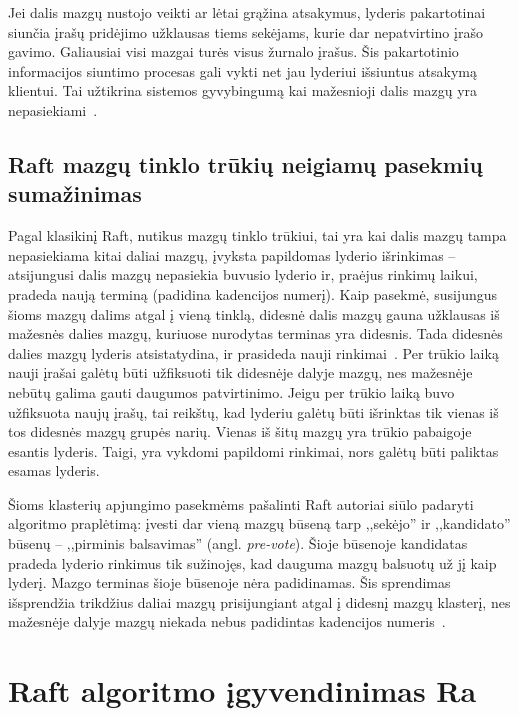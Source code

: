 \documentclass{VUMIFPSkursinis}
\begin{document}
Jei dalis mazgų nustojo veikti ar lėtai grąžina atsakymus, lyderis pakartotinai siunčia įrašų pridėjimo užklausas tiems sekėjams, kurie dar nepatvirtino įrašo gavimo. Galiausiai visi mazgai turės visus žurnalo įrašus. Šis pakartotinio informacijos siuntimo procesas gali vykti net jau lyderiui išsiuntus atsakymą klientui. Tai užtikrina sistemos gyvybingumą kai mažesnioji dalis mazgų yra nepasiekiami~\cite{ongaro_consensus}.

\subsection{Raft mazgų tinklo trūkių neigiamų pasekmių sumažinimas}

Pagal klasikinį Raft, nutikus mazgų tinklo trūkiui, tai yra kai dalis mazgų tampa nepasiekiama kitai daliai mazgų, įvyksta papildomas lyderio išrinkimas -- atsijungusi dalis mazgų nepasiekia buvusio lyderio ir, praėjus rinkimų laikui, pradeda naują terminą (padidina kadencijos numerį). Kaip pasekmė, susijungus šioms mazgų dalims atgal į vieną tinklą, didesnė dalis mazgų gauna užklausas iš mažesnės dalies mazgų, kuriuose nurodytas terminas yra didesnis. Tada didesnės dalies mazgų lyderis atsistatydina, ir prasideda nauji rinkimai~\cite{ongaro_consensus}. Per trūkio laiką nauji įrašai galėtų būti užfiksuoti tik didesnėje dalyje mazgų, nes mažesnėje nebūtų galima gauti daugumos patvirtinimo. Jeigu per trūkio laiką buvo užfiksuota naujų įrašų, tai reikštų, kad lyderiu galėtų būti išrinktas tik vienas iš tos didesnės mazgų grupės narių. Vienas iš šitų mazgų yra trūkio pabaigoje esantis lyderis. Taigi, yra vykdomi papildomi rinkimai, nors galėtų būti paliktas esamas lyderis.

Šioms klasterių apjungimo pasekmėms pašalinti Raft autoriai siūlo padaryti algoritmo praplėtimą: įvesti dar vieną mazgų būseną tarp ,,sekėjo'' ir ,,kandidato'' būsenų -- ,,pirminis balsavimas'' (angl. \textit{pre-vote}). Šioje būsenoje kandidatas pradeda lyderio rinkimus tik sužinojęs, kad dauguma mazgų balsuotų už jį kaip lyderį. Mazgo terminas šioje būsenoje nėra padidinamas. Šis sprendimas išsprendžia trikdžius daliai mazgų prisijungiant atgal į didesnį mazgų klasterį, nes mažesnėje dalyje mazgų niekada nebus padidintas kadencijos numeris~\cite{ongaro_consensus}.

\section{Raft algoritmo įgyvendinimas Ra}
\end{document}
